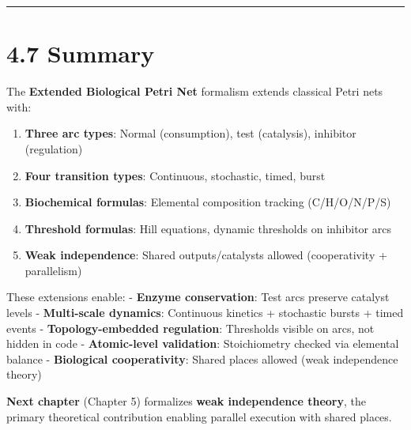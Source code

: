 \begin{center}\rule{0.5\linewidth}{0.5pt}\end{center}

\hypertarget{summary}{%
\section{4.7 Summary}\label{summary}}

The \textbf{Extended Biological Petri Net} formalism extends classical
Petri nets with:

\begin{enumerate}
\def\labelenumi{\arabic{enumi}.}
\tightlist
\item
  \textbf{Three arc types}: Normal (consumption), test (catalysis),
  inhibitor (regulation)
\item
  \textbf{Four transition types}: Continuous, stochastic, timed, burst
\item
  \textbf{Biochemical formulas}: Elemental composition tracking
  (C/H/O/N/P/S)
\item
  \textbf{Threshold formulas}: Hill equations, dynamic thresholds on
  inhibitor arcs
\item
  \textbf{Weak independence}: Shared outputs/catalysts allowed
  (cooperativity + parallelism)
\end{enumerate}

These extensions enable: - \checkmark \textbf{Enzyme conservation}: Test arcs
preserve catalyst levels - \checkmark \textbf{Multi-scale dynamics}: Continuous
kinetics + stochastic bursts + timed events - \checkmark
\textbf{Topology-embedded regulation}: Thresholds visible on arcs, not
hidden in code - \checkmark \textbf{Atomic-level validation}: Stoichiometry
checked via elemental balance - \checkmark \textbf{Biological cooperativity}:
Shared places allowed (weak independence theory)

\textbf{Next chapter} (Chapter 5) formalizes \textbf{weak independence
theory}, the primary theoretical contribution enabling parallel
execution with shared places.
